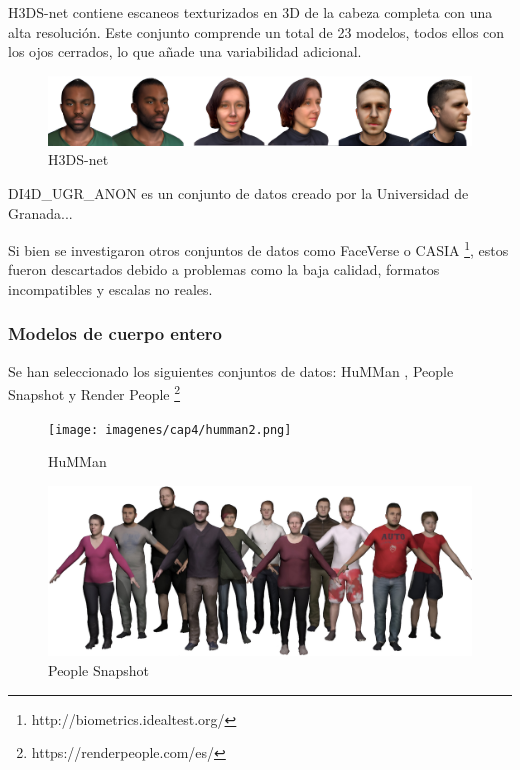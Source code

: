 H3DS-net \cite{61} contiene escaneos texturizados en 3D de la cabeza completa con una alta resolución. Este conjunto comprende un total de 23 modelos, todos ellos con los ojos cerrados, lo que añade una variabilidad adicional.

\begin{figure}[h]
	\centering
	\includegraphics[scale=0.1]{imagenes/cap4/h3dsnet2.png}
	\caption{H3DS-net}
	\label{fig2}
\end{figure}

DI4D\_UGR\_ANON es un conjunto de datos creado por la Universidad de Granada...



Si bien se investigaron otros conjuntos de datos como FaceVerse \cite{64} o CASIA \footnote{http://biometrics.idealtest.org/}, estos fueron descartados debido a problemas como la baja calidad, formatos incompatibles y escalas no reales.

\subsubsection{Modelos de cuerpo entero}
Se han seleccionado los siguientes conjuntos de datos: HuMMan \cite{62}, People Snapshot \cite{63} y Render People \footnote{https://renderpeople.com/es/}

\begin{figure}[h]
	\centering
	\texttt{[image: imagenes/cap4/humman2.png]}
	\caption{HuMMan}
	\label{fig3}
\end{figure}

\begin{figure}[h]
	\centering
	\includegraphics[scale=0.5]{imagenes/cap4/snapshot2.png}
	\caption{People Snapshot}
	\label{fig4}
\end{figure}

